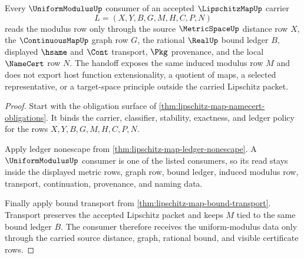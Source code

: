 \begin{theorem}
\label{thm:lipschitz-map-uniform-modulus-consumer-handoff}
Every $\UniformModulusUp$ consumer of an accepted $\LipschitzMapUp$ carrier
$$
L=(X,Y,B,G,M,H,C,P,N)
$$
reads the modulus row only through the source $\MetricSpaceUp$ distance row
$X$, the $\ContinuousMapUp$ graph row $G$, the rational $\RealUp$ bound ledger
$B$, displayed $\hsame$ and $\Cont$ transport, $\Pkg$ provenance, and the local
$\NameCert$ row $N$. The handoff exposes the same induced modulus row $M$ and
does not export host function extensionality, a quotient of maps, a selected
representative, or a target-space principle outside the carried Lipschitz
packet.
\end{theorem}
\begin{proof}
Start with the obligation surface of
\autoref{thm:lipschitz-map-namecert-obligations}. It binds the carrier,
classifier, stability, exactness, and ledger policy for the rows
$X,Y,B,G,M,H,C,P,N$.

Apply ledger nonescape from \autoref{thm:lipschitz-map-ledger-nonescape}. A
$\UniformModulusUp$ consumer is one of the listed consumers, so its read stays
inside the displayed metric rows, graph row, bound ledger, induced modulus row,
transport, continuation, provenance, and naming data.

Finally apply bound transport from \autoref{thm:lipschitz-map-bound-transport}.
Transport preserves the accepted Lipschitz packet and keeps $M$ tied to the
same bound ledger $B$. The consumer therefore receives the uniform-modulus data
only through the carried source distance, graph, rational bound, and visible
certificate rows.
\end{proof}


